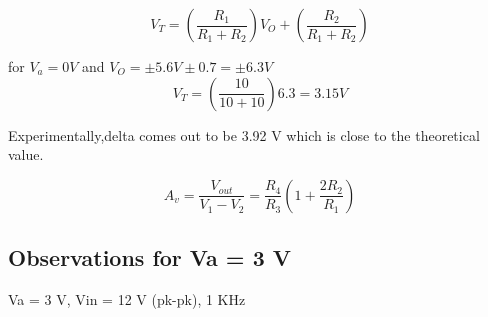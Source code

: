 \documentclass[12pt]{article}
\begin{document}
\begin{equation}
    V_{T}=(\frac{R_{1}}{R_{1} + R_{2}})V_{O} + (\frac{R_{2}}{R_{1}+R_{2}})
 \end{equation}

for $V_{a}=0 V$ and $V_{O}=\pm5.6 V \pm0.7 = \pm 6.3 V$
\begin{equation}V_{T}=(\frac{10}{10 + 10})6.3 = 3.15 V
\end{equation}

Experimentally,delta comes out to be 3.92 V which is close to the theoretical value.


\begin{equation}
    A_{v}=\frac{V_{out}}{V_{1}-V_{2}} = \frac{R_{4}}{R_{3}}(1 + \frac{2R_{2}}{R_{1}})
\end{equation}
\subsection{Observations for Va = 3 V}
Va = 3 V, Vin = 12 V (pk-pk), 1 KHz
\end{document}
